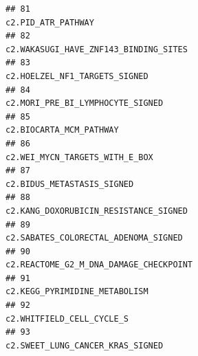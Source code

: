 \documentclass{article}\usepackage[]{graphicx}\usepackage[]{color}
\makeatletter
\newenvironment{kframe}{%
 \def\at@end@of@kframe{}%
 \ifinner\ifhmode%
  \def\at@end@of@kframe{\end{minipage}}%
  \begin{minipage}{\columnwidth}%
 \fi\fi%
 \def\FrameCommand##1{\hskip\@totalleftmargin \hskip-\fboxsep
 \colorbox{shadecolor}{##1}\hskip-\fboxsep
     \hskip-\linewidth \hskip-\@totalleftmargin \hskip\columnwidth}%
 \MakeFramed {\advance\hsize-\width
   \@totalleftmargin\z@ \linewidth\hsize
   \@setminipage}}%
 {\par\unskip\endMakeFramed%
 \at@end@of@kframe}
\newenvironment{knitrout}{}{} %
\makeatother
\begin{document}
\begin{knitrout}
\begin{kframe}
\begin{verbatim}
## 81                                                                                                                                                                                                c2.PID_ATR_PATHWAY
## 82                                                                                                                                                                             c2.WAKASUGI_HAVE_ZNF143_BINDING_SITES
## 83                                                                                                                                                                                     c2.HOELZEL_NF1_TARGETS_SIGNED
## 84                                                                                                                                                                                  c2.MORI_PRE_BI_LYMPHOCYTE_SIGNED
## 85                                                                                                                                                                                           c2.BIOCARTA_MCM_PATHWAY
## 86                                                                                                                                                                                    c2.WEI_MYCN_TARGETS_WITH_E_BOX
## 87                                                                                                                                                                                        c2.BIDUS_METASTASIS_SIGNED
## 88                                                                                                                                                                             c2.KANG_DOXORUBICIN_RESISTANCE_SIGNED
## 89                                                                                                                                                                              c2.SABATES_COLORECTAL_ADENOMA_SIGNED
## 90                                                                                                                                                                            c2.REACTOME_G2_M_DNA_DAMAGE_CHECKPOINT
## 91                                                                                                                                                                                     c2.KEGG_PYRIMIDINE_METABOLISM
## 92                                                                                                                                                                                         c2.WHITFIELD_CELL_CYCLE_S
## 93                                                                                                                                                                                  c2.SWEET_LUNG_CANCER_KRAS_SIGNED

\end{verbatim}
\end{kframe}
\end{knitrout}
\end{document}
